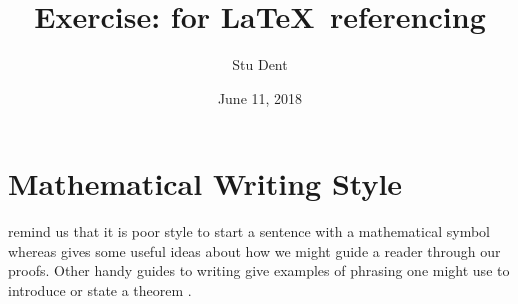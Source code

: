 \documentclass[a4paper,11pt]{article}
\title{Exercise: \hologo{BibTeX} for \LaTeX\, referencing}
\author{Stu Dent}
\date{June 11, 2018}
\begin{document}
\maketitle

\section{Mathematical Writing Style}

\citeauthor{knuth-1989-mathematical-writing} \citep[p.~1]{knuth-1989-mathematical-writing} remind us that it is poor style to start a sentence with a mathematical symbol whereas \citeauthor{higham-1998-handbook} \citep[pp.~17--18]{higham-1998-handbook} gives some useful ideas about how we might guide a reader through our proofs. Other handy guides to writing give examples of phrasing one might use to introduce or state a theorem \citep[\S~2]{trzeciak-1995-writing}.


\end{document}

